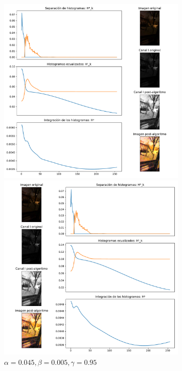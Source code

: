 \begin{figure}[H]
\begin{minipage}[c]{0.48\linewidth}
  \includegraphics[height=9cm]{imgs/porch-095-005-9.pdf}
  \caption{$\alpha = 0.095, \beta = 0.005, \gamma = 0.9$}
\end{minipage}
\hfill
\begin{minipage}[c]{0.48\linewidth}
  \includegraphics[height=9cm]{imgs/porch-045-005-95.pdf}
  \caption{$\alpha = 0.045, \beta = 0.005, \gamma = 0.95$}
\end{minipage}%
\end{figure}

